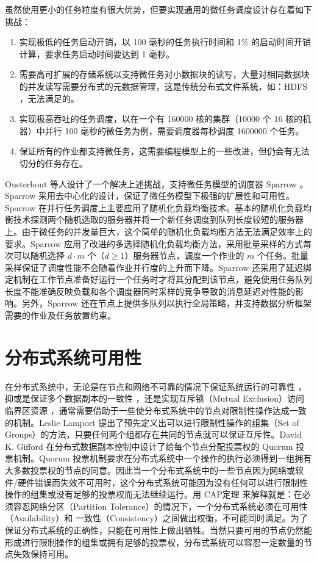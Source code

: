 虽然使用更小的任务粒度有很大优势，但要实现通用的微任务调度设计存在着如下挑战：
\begin{enumerate}
\item 实现极低的任务启动开销，以 100 毫秒的任务执行时间和 1\% 的启动时间开销计算，要求任务启动时间要达到 1 毫秒。
\item 需要高可扩展的存储系统以支持微任务对小数据块的读写，大量对相同数据块的并发读写需要分布式的元数据管理，这是传统分布式文件系统，如：HDFS \cite{hadoop}，无法满足的。
\item 实现极高吞吐的任务调度，以在一个有 160000 核的集群（10000 个 16 核的机器）中并行 100 毫秒的微任务为例，需要调度器每秒调度 1600000 个任务。
\item 保证所有的作业都支持微任务，这需要编程模型上的一些改进，但仍会有无法切分的任务存在。
\end{enumerate}

Ousterhout 等人设计了一个解决上述挑战，支持微任务模型的调度器 Sparrow \cite{Ousterhout:2013:SDL:2517349.2522716}。Sparrow 采用去中心化的设计，保证了微任务模型下极强的扩展性和可用性。Sparrow 在并行任务调度上主要应用了随机化负载均衡技术。基本的随机化负载均衡技术探测两个随机选取的服务器并将一个新任务调度到队列长度较短的服务器上。由于微任务的并发量巨大，这个简单的随机化负载均衡方法无法满足效率上的要求。Sparrow 应用了改进的多选择随机化负载均衡方法，采用批量采样的方式每次可以随机选择 $d \cdot m$ 个（$d \geq 1$）服务器节点，调度一个作业的 $m$ 个任务。批量采样保证了调度性能不会随着作业并行度的上升而下降。Sparrow 还采用了延迟绑定机制在工作节点准备好运行一个任务时才将其分配到该节点，避免使用任务队列长度不能准确反映负载和各个调度器同时采样的竞争导致的消息延迟对性能的影响。另外，Sparrow 还在节点上提供多队列以执行全局策略，并支持数据分析框架需要的作业及任务放置约束。

\section{分布式系统可用性}
在分布式系统中，无论是在节点和网络不可靠的情况下保证系统运行的可靠性 \cite{Lamport197895}，抑或是保证多个数据副本的一致性 \cite{Gifford:1979:WVR:800215.806583}，还是实现互斥锁（Mutual Exclusion）访问临界区资源 \cite{Garcia-Molina:1985:AVD:4221.4223}，通常需要借助于一些使分布式系统中的节点对限制性操作达成一致的机制。Leslie Lamport \cite{Lamport197895} 提出了预先定义出可以进行限制性操作的组集（Set of Groups）的方法，只要任何两个组都存在共同的节点就可以保证互斥性。David K. Gifford \cite{Gifford:1979:WVR:800215.806583} 在分布式数据副本控制中设计了给每个节点分配投票权的 Quorum 投票机制。Quorum 投票机制要求在分布式系统中一个操作的执行必须得到一组拥有大多数投票权的节点的同意。因此当一个分布式系统中的一些节点因为网络或软件/硬件错误而失效不可用时，这个分布式系统可能因为没有任何可以进行限制性操作的组集或没有足够的投票权而无法继续运行。用 CAP定理 \cite{Fox:1999:HYS:822076.822436} 来解释就是：在必须容忍网络分区（Partition Tolerance）的情况下，一个分布式系统必须在可用性（Availability）和 一致性（Consistency）之间做出权衡，不可能同时满足。为了保证分布式系统的正确性，只能在可用性上做出牺牲。当然只要可用的节点仍然能形成进行限制操作的组集或拥有足够的投票权，分布式系统可以容忍一定数量的节点失效保持可用。


